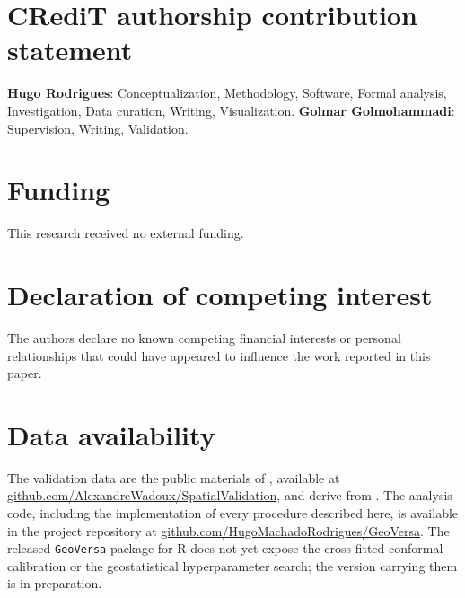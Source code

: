 \documentclass[preprint,12pt,authoryear]{elsarticle}
\begin{document}
\section*{CRediT authorship contribution statement}

\textbf{Hugo Rodrigues}: Conceptualization, Methodology, Software, Formal
analysis, Investigation, Data curation, Writing, Visualization.
\textbf{Golmar Golmohammadi}: Supervision, Writing, Validation.

\section*{Funding}

This research received no external funding.

\section*{Declaration of competing interest}

The authors declare no known competing financial interests or personal
relationships that could have appeared to influence the work reported in this
paper.

\section*{Data availability}

The validation data are the public materials of \citet{wadoux2021}, available at
\url{github.com/AlexandreWadoux/SpatialValidation}, and derive from
\citet{baccini2012}. The analysis code, including the implementation of every
procedure described here, is available in the project repository at
\url{github.com/HugoMachadoRodrigues/GeoVersa}. The released \texttt{GeoVersa} package
for R does not yet expose the cross-fitted conformal calibration or the
geostatistical hyperparameter search; the version carrying them is in
preparation.



\end{document}
